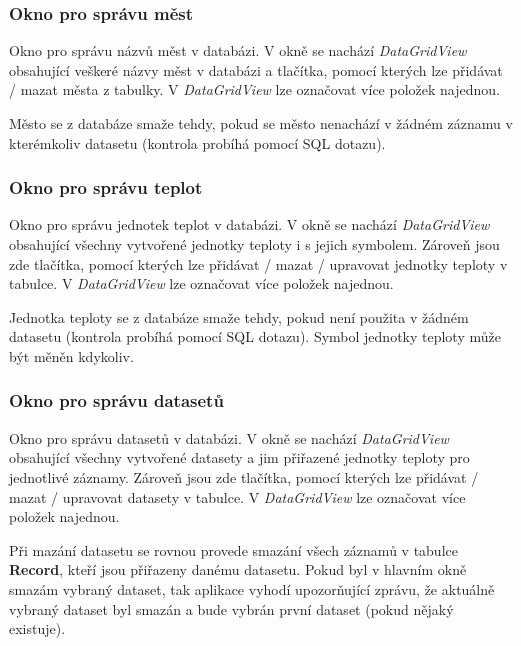 \documentclass[12pt, a4paper]{article}
\begin{document}
\subsubsection{Okno pro správu měst}
 Okno pro správu názvů měst v databázi. V okně se nachází \textit{DataGridView} obsahující veškeré názvy měst v databázi a tlačítka, pomocí kterých lze přidávat / mazat města z tabulky. V \textit{DataGridView} lze označovat více položek najednou.

Město se z databáze smaže tehdy, pokud se město nenachází v žádném záznamu v kterémkoliv datasetu (kontrola probíhá pomocí SQL dotazu).

\subsubsection{Okno pro správu teplot}
Okno pro správu jednotek teplot v databázi. V okně se nachází \textit{DataGridView} obsahující všechny vytvořené jednotky teploty i s jejich symbolem. Zároveň jsou zde tlačítka, pomocí kterých lze přidávat / mazat / upravovat jednotky teploty v tabulce. V \textit{DataGridView} lze označovat více položek najednou.

Jednotka teploty se z databáze smaže tehdy, pokud není použita v žádném datasetu (kontrola probíhá pomocí SQL dotazu). Symbol jednotky teploty může být měněn kdykoliv.

\subsubsection{Okno pro správu datasetů}
Okno pro správu datasetů v databázi. V okně se nachází \textit{DataGridView} obsahující všechny vytvořené datasety a jim přiřazené jednotky teploty pro jednotlivé záznamy. Zároveň jsou zde tlačítka, pomocí kterých lze přidávat / mazat / upravovat datasety v tabulce. V \textit{DataGridView} lze označovat více položek najednou.

Při mazání datasetu se rovnou provede smazání všech záznamů v tabulce \textbf{Record}, kteří jsou přiřazeny danému datasetu. Pokud byl v hlavním okně smazám vybraný dataset, tak aplikace vyhodí upozorňující zprávu, že aktuálně vybraný dataset byl smazán a bude vybrán první dataset (pokud nějaký existuje).
\end{document}
